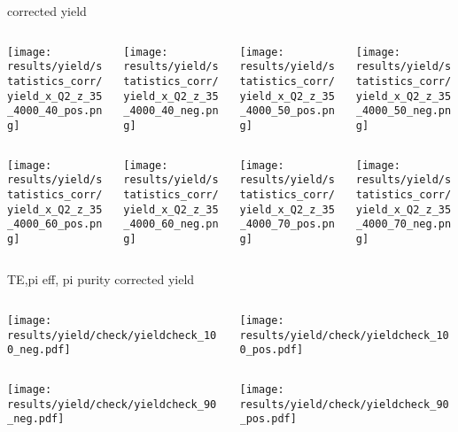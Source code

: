 \begin{frame}{corrected yield}
\begin{columns}
\begin{column}[T]{0.25\textwidth}
\texttt{[image: results/yield/statistics\_corr/yield\_x\_Q2\_z\_35\_4000\_40\_pos.png]}
\end{column}
\begin{column}[T]{0.25\textwidth}
\texttt{[image: results/yield/statistics\_corr/yield\_x\_Q2\_z\_35\_4000\_40\_neg.png]}
\end{column}
\begin{column}[T]{0.25\textwidth}
\texttt{[image: results/yield/statistics\_corr/yield\_x\_Q2\_z\_35\_4000\_50\_pos.png]}
\end{column}
\begin{column}[T]{0.25\textwidth}
\texttt{[image: results/yield/statistics\_corr/yield\_x\_Q2\_z\_35\_4000\_50\_neg.png]}
\end{column}
\end{columns}
\begin{columns}
\begin{column}[T]{0.25\textwidth}
\texttt{[image: results/yield/statistics\_corr/yield\_x\_Q2\_z\_35\_4000\_60\_pos.png]}
\end{column}
\begin{column}[T]{0.25\textwidth}
\texttt{[image: results/yield/statistics\_corr/yield\_x\_Q2\_z\_35\_4000\_60\_neg.png]}
\end{column}
\begin{column}[T]{0.25\textwidth}
\texttt{[image: results/yield/statistics\_corr/yield\_x\_Q2\_z\_35\_4000\_70\_pos.png]}
\end{column}
\begin{column}[T]{0.25\textwidth}
\texttt{[image: results/yield/statistics\_corr/yield\_x\_Q2\_z\_35\_4000\_70\_neg.png]}
\end{column}
\end{columns}
\end{frame}
\begin{frame}{TE,pi eff, pi purity corrected yield}
\begin{columns}
\begin{column}[T]{0.5\textwidth}
\texttt{[image: results/yield/check/yieldcheck\_100\_neg.pdf]}
\end{column}
\begin{column}[T]{0.5\textwidth}
\texttt{[image: results/yield/check/yieldcheck\_100\_pos.pdf]}
\end{column}
\end{columns}
\begin{columns}
\begin{column}[T]{0.5\textwidth}
\texttt{[image: results/yield/check/yieldcheck\_90\_neg.pdf]}
\end{column}
\begin{column}[T]{0.5\textwidth}
\texttt{[image: results/yield/check/yieldcheck\_90\_pos.pdf]}
\end{column}
\end{columns}
\end{frame}
